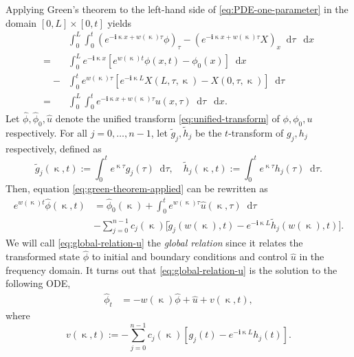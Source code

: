 \documentclass[journal,twoside,web]{ieeecolor}
\newcommand{\state}{\phi}
\newcommand{\statehat}{\hat{\state}}
\newcommand{\im}{\mathbf{i}}
\newcommand*\diff{\mathop{}\!\mathrm{d}}
\newcommand{\kcomplex}{\upkappa}
\begin{document}
Applying Green's theorem to the left-hand side of \eqref{eq:PDE-one-parameter} in the domain $[0,L]\times[0,t]$ yields
\begin{equation} \label{eq:green-theorem-applied}
	\begin{aligned}
		&\int_{0}^{L}\int_{0}^{t} \left( e^{-\im \kcomplex x + w(\kcomplex)\tau} \state \right)_\tau - \left(e^{-\im \kcomplex x + w(\kcomplex)\tau} X \right)_x \diff \tau\ \diff x\\
		=&\int_{0}^{L} e^{-\im \kcomplex x} \left[ e^{w(\kcomplex)t}\state(x,t)-\state_0(x)\right] \diff x \\
		\quad - &\int_{0}^{t} e^{w(\kcomplex)\tau}\left[e^{-\im \kcomplex L}X(L,\tau,\kcomplex) - X(0,\tau,\kcomplex)\right]\diff \tau \\
		= &\int_{0}^{L}\int_{0}^{t} e^{-\im \kcomplex x + w(\kcomplex)\tau}u(x,\tau)\diff \tau\ \diff x.   
	\end{aligned}
\end{equation}
Let $\statehat, \statehat_0, \hat{u}$ denote the unified transform \eqref{eq:unified-transform} of $\state, \state_0, u$ respectively.
For all $j=0,\ldots,n-1$, let $\tilde{g}_j,\tilde{h}_j$ be the $t$-transform of $g_j,h_j$ respectively, defined as 
\begin{equation*}
	\tilde{g}_j(\kcomplex,t) := \int_{0}^{t}e^{\kcomplex\tau}g_j(\tau)\diff \tau,\quad \tilde{h}_j(\kcomplex,t) := \int_{0}^{t}e^{\kcomplex\tau}h_j(\tau)\diff \tau.
\end{equation*}  
Then, equation \eqref{eq:green-theorem-applied} can be rewritten as
\begin{equation}\label{eq:global-relation-u}
	\begin{aligned}
		e^{w(\kcomplex)t}\statehat(\kcomplex,t) &= \statehat_0(\kcomplex) + \int_{0}^{t}e^{w(\kcomplex)\tau}\hat{u}(\kcomplex,\tau)\diff \tau \\
		&- \sum_{j=0}^{n-1}c_j(\kcomplex)\big[\tilde{g}_j(w(\kcomplex),t) - e^{-\im \kcomplex L}\tilde{h}_j(w(\kcomplex),t)\big].
	\end{aligned}
\end{equation}
We will call \eqref{eq:global-relation-u} the \emph{global relation} since it relates the transformed state $\statehat$ to initial and boundary conditions and control $\hat{u}$ in the frequency domain. It turns out that \eqref{eq:global-relation-u} is the solution to the following ODE,
\begin{equation}\label{eq:global-relation-u-ode}
	\begin{aligned}
		\statehat_t &= -w(\kcomplex)\statehat + \hat{u} + v(\kcomplex,t),
	\end{aligned}
\end{equation}
where 
\begin{equation}\label{eq:boundary-value-v}
	v(\kcomplex,t):=-\sum_{j=0}^{n-1}c_j(\kcomplex)\left[g_j(t) - e^{-\im \kcomplex L}h_j(t)\right].
\end{equation}
\end{document}
